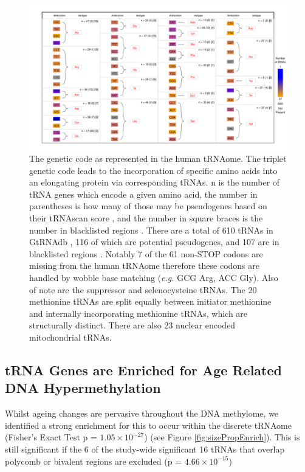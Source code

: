 \documentclass[]{book}
\begin{document}
\begin{figure}

{\centering \includegraphics[width=1\linewidth]{figs/kutteresq_BLcount} 

}

\caption{The genetic code as represented in the human tRNAome. The triplet genetic code leads to the incorporation of specific amino acids into an elongating protein via corresponding tRNAs. n is the number of tRNA genes which encode a given amino acid, the number in parentheses is how many of those may be pseudogenes based on their tRNAscan score \citep{Lowe2016}, and the number in square braces is the number in blacklisted regions \citep{Amemiya2019}. There are a total of 610 tRNAs in GtRNAdb \citep{Chan2009}, 116 of which are potential pseudogenes, and 107 are in blacklisted regions \citep{Amemiya2019}. Notably 7 of the 61 non-STOP codons are missing from the human tRNAome therefore these codons are handled by wobble base matching (\emph{e.g.} GCG Arg, ACC Gly). Also of note are the suppressor and selenocysteine tRNAs. The 20 methionine tRNAs are split equally between initiator methionine and internally incorporating methionine tRNAs, which are structurally distinct. There are also 23 nuclear encoded mitochondrial tRNAs.}\label{fig:kutteresq}
\end{figure}



\hypertarget{trna-genes-are-enriched-for-age-related-dna-hypermethylation}{%
\subsection{tRNA Genes are Enriched for Age Related DNA Hypermethylation}\label{trna-genes-are-enriched-for-age-related-dna-hypermethylation}}

Whilst ageing changes are pervasive throughout the DNA methylome, we identified a strong enrichment for this to occur within the discrete tRNAome (Fisher's Exact Test p = \(1.05\times10^{-27}\)) (see Figure \ref{fig:sizePropEnrich}).
This is still significant if the 6 of the study-wide significant 16 tRNAs that overlap polycomb or bivalent regions are excluded (p = \(4.66\times10^{-15}\))
\end{document}
